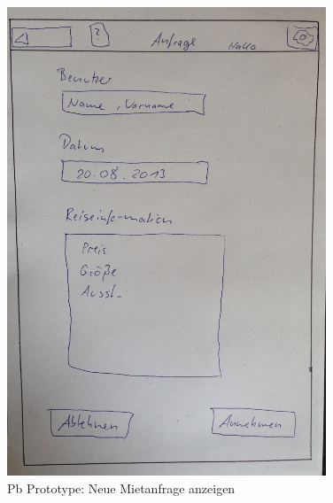 \begin{figure}[H]
\centering
\includegraphics[angle=90, width=0.85\textwidth]{./images/paperbased/anfrageAnzeigen.JPG}
\caption{Pb Prototype: Neue Mietanfrage anzeigen}
\label{pbprototype2}
\end{figure}


